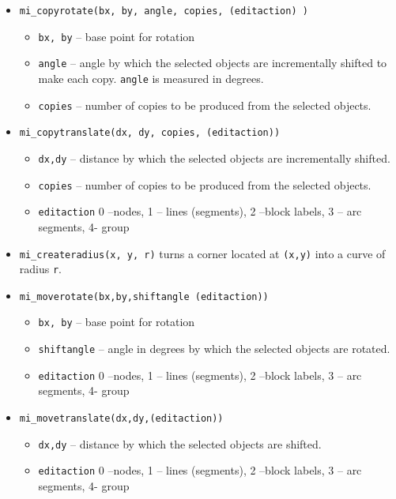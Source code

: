 \begin{itemize}
\item{\tt mi\_copyrotate(bx, by, angle, copies, (editaction) )}
        \begin{itemize}
        \item{\tt bx, by} -- base point for rotation
        \item{\tt angle} -- angle by which the selected objects are incrementally
        shifted to make each copy.  {\tt angle} is measured in degrees.
        \item{\tt copies} -- number of copies to be produced from
        the selected objects.

        \end{itemize}

\item{\tt mi\_copytranslate(dx, dy, copies, (editaction))}
        \begin{itemize}
        \item{\tt dx,dy} -- distance by which the selected objects are incrementally shifted.
        \item{\tt copies} -- number of copies to be produced from the selected objects.
        \item{\tt editaction}  0 --nodes, 1 -- lines (segments), 2 --block labels, 3 -- arc
                segments, 4- group
        \end{itemize}

\item{\tt mi\_createradius(x, y, r)} turns a corner located at {\tt (x,y)} into a curve of radius {\tt r}.

\item{\tt mi\_moverotate(bx,by,shiftangle (editaction))}
        \begin{itemize}
        \item{\tt bx, by} -- base point for rotation
        \item{\tt shiftangle} -- angle in degrees by which the selected objects are rotated.
        \item{\tt editaction}  0 --nodes, 1 -- lines (segments), 2 --block labels, 3 -- arc
                segments, 4- group
        \end{itemize}

\item{\tt mi\_movetranslate(dx,dy,(editaction))}
        \begin{itemize}
        \item{\tt dx,dy} -- distance by which the selected objects are shifted.
        \item{\tt editaction}  0 --nodes, 1 -- lines (segments), 2 --block labels, 3 -- arc
                segments, 4- group
        \end{itemize}


\end{itemize}
